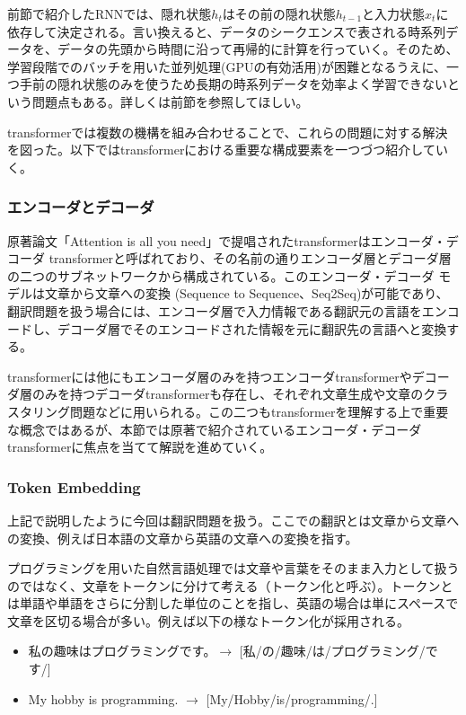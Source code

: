 
前節で紹介したRNNでは、隠れ状態$h_t$はその前の隠れ状態$h_{t-1}$と入力状態$x_t$に依存して決定される。言い換えると、データのシークエンスで表される時系列データを、データの先頭から時間に沿って再帰的に計算を行っていく。そのため、学習段階でのバッチを用いた並列処理(GPUの有効活用)が困難となるうえに、一つ手前の隠れ状態のみを使うため長期の時系列データを効率よく学習できないという問題点もある。詳しくは前節を参照してほしい。

transformerでは複数の機構を組み合わせることで、これらの問題に対する解決を図った。以下ではtransformerにおける重要な構成要素を一つづつ紹介していく。



\subsubsection{エンコーダとデコーダ}
原著論文「Attention is all you need」で提唱されたtransformerはエンコーダ・デコーダ transformerと呼ばれており、その名前の通りエンコーダ層とデコーダ層の二つのサブネットワークから構成されている。このエンコーダ・デコーダ モデルは文章から文章への変換 (Sequence to Sequence、Seq2Seq)が可能であり、翻訳問題を扱う場合には、エンコーダ層で入力情報である翻訳元の言語をエンコードし、デコーダ層でそのエンコードされた情報を元に翻訳先の言語へと変換する。

transformerには他にもエンコーダ層のみを持つエンコーダtransformerやデコーダ層のみを持つデコーダtransformerも存在し、それぞれ文章生成や文章のクラスタリング問題などに用いられる。この二つもtransformerを理解する上で重要な概念ではあるが、本節では原著で紹介されているエンコーダ・デコーダtransformerに焦点を当てて解説を進めていく。


\subsubsection{Token Embedding}
上記で説明したように今回は翻訳問題を扱う。ここでの翻訳とは文章から文章への変換、例えば日本語の文章から英語の文章への変換を指す。

プログラミングを用いた自然言語処理では文章や言葉をそのまま入力として扱うのではなく、文章をトークンに分けて考える（トークン化と呼ぶ）。トークンとは単語や単語をさらに分割した単位のことを指し、英語の場合は単にスペースで文章を区切る場合が多い。例えば以下の様なトークン化が採用される。


\begin{itemize}
\item 私の趣味はプログラミングです。$\rightarrow$ [私/の/趣味/は/プログラミング/です/]
\item My hobby is programming. $\rightarrow$ [My/Hobby/is/programming/.]
\end{itemize}

